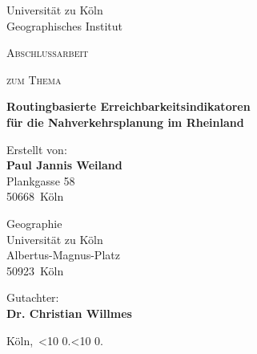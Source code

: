 \documentclass[11pt,pdftex,a4paper]{scrartcl}
\title{\haThema}
\author{\haAutor}
\date{\today}
\newcommand{\leadingzero}[1]{\ifnum #1<10 0\the#1\else\the#1\fi}
\newcommand{\datumVonHeute}{\leadingzero{\day}.\leadingzero{\month}.\the\year}
\newcommand{\haThema}{Routingbasierte Erreichbarkeitsindikatoren \\ für die Nahverkehrsplanung im Rheinland}
\newcommand{\haAutor}{Paul Jannis Weiland}
\newcommand{\haAutorAdresse}{Plankgasse 58}
\newcommand{\haAutorPLZ}{50668}
\newcommand{\haAutorOrt}{Köln}
\newcommand{\haDeckblattTextEins}{Abschlussarbeit}
\newcommand{\haDeckblattTextZwei}{Geographie}
\newcommand{\haSchule}{Universität zu Köln}
\newcommand{\haSchuleAdresse}{Albertus-Magnus-Platz}
\newcommand{\haSchulePLZ}{50923}
\newcommand{\haSchuleOrt}{Köln}
\newcommand{\haGutachter}{Dr. Christian Willmes}
\newcommand{\haGutachterText}{}
\begin{document}
	
	\begin{titlepage}
		Universität zu Köln\\
		Geographisches Institut
		\begin{center}
			\vspace{1.5cm}
			{\scshape\large \haDeckblattTextEins \par}
			\vspace{1cm}
			{\scshape\large zum Thema\par}
			\vspace{1.5cm}
			{\LARGE\bfseries \haThema \par}
			\vfill
			{Erstellt von:\\ {\bfseries \haAutor}\\ \haAutorAdresse\\ \haAutorPLZ~\haAutorOrt \par}
			\vspace{1cm}
			{\haDeckblattTextZwei \\ \haSchule \\ \haSchuleAdresse \\ \haSchulePLZ~\haSchuleOrt \par}
			\vspace{1cm}
			Gutachter:\\ {\bfseries \haGutachter}\\ \haGutachterText
			\vfill
		\end{center}
		{\haAutorOrt,~\datumVonHeute\par}
	\end{titlepage}
	\thispagestyle{empty}
	\newpage
	
	{\hypersetup{linkcolor=black}
	\tableofcontents
	\thispagestyle{empty}
	\newpage
	\listoffigures
	\thispagestyle{empty}
	\newpage
	\listoftables
	\thispagestyle{empty}
	\newpage
	}

	\setcounter{page}{1}
\end{document}
